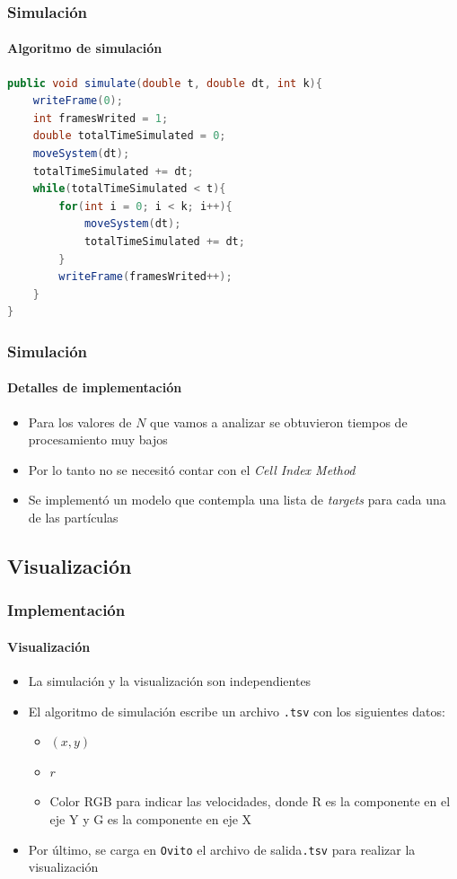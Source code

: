 \documentclass[hyperref={pdfpagelayout=SinglePage}]{beamer}
\begin{document}
\begin{frame}[fragile]
\frametitle{Simulación}
\framesubtitle{Algoritmo de simulación}
\begin{lstlisting}[language=Java, caption = Algoritmo de simulación]
public void simulate(double t, double dt, int k){
	writeFrame(0);
	int framesWrited = 1;
	double totalTimeSimulated = 0;
	moveSystem(dt);
	totalTimeSimulated += dt;
	while(totalTimeSimulated < t){
		for(int i = 0; i < k; i++){
			moveSystem(dt);
			totalTimeSimulated += dt;
		}
		writeFrame(framesWrited++);
	}
}
\end{lstlisting}
\end{frame}

\begin{frame}
\frametitle{Simulación}
\framesubtitle{Detalles de implementación}
\begin{itemize}
	\item Para los valores de $N$ que vamos a analizar se obtuvieron tiempos de procesamiento muy bajos
	\item Por lo tanto no se necesitó contar con el \textit{Cell Index Method}
	\item Se implementó un modelo que contempla una lista de \textit{targets} para cada una de las partículas
\end{itemize}
\end{frame}

\subsection{Visualización}

\begin{frame}
\frametitle{Implementación}
\framesubtitle{Visualización}
\begin{itemize}
	\item La simulación y la visualización son independientes
	\item El algoritmo de simulación escribe un archivo \texttt{.tsv} con los siguientes datos:
	\begin{itemize}
		\item $(x,y)$
		\item $r$
		\item Color RGB para indicar las velocidades, donde R es la componente en el eje Y y G es la componente en eje X
	\end{itemize}
	\item Por último, se carga en \texttt{Ovito} el archivo de salida\texttt{.tsv} para realizar la visualización
\end{itemize}
\end{frame}
\end{document}
